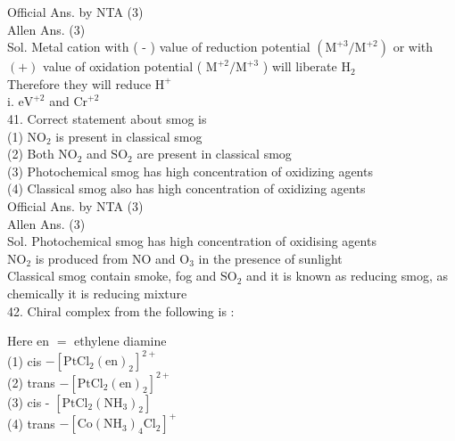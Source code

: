 \documentclass[10pt]{article}
\begin{document}
Official Ans. by NTA (3)\\
Allen Ans. (3)\\
Sol. Metal cation with ( - ) value of reduction potential \(\left(\mathrm{M}^{+3} / \mathrm{M}^{+2}\right)\) or with \((+)\) value of oxidation potential ( \(\mathrm{M}^{+2} / \mathrm{M}^{+3}\) ) will liberate \(\mathrm{H}_{2}\)\\
Therefore they will reduce \(\mathrm{H}^{+}\)\\
i. \(\mathrm{eV}^{+2}\) and \(\mathrm{Cr}^{+2}\)\\
41. Correct statement about smog is\\
(1) \(\mathrm{NO}_{2}\) is present in classical smog\\
(2) Both \(\mathrm{NO}_{2}\) and \(\mathrm{SO}_{2}\) are present in classical smog\\
(3) Photochemical smog has high concentration of oxidizing agents\\
(4) Classical smog also has high concentration of oxidizing agents\\
Official Ans. by NTA (3)\\
Allen Ans. (3)\\
Sol. Photochemical smog has high concentration of oxidising agents\\
\(\mathrm{NO}_{2}\) is produced from NO and \(\mathrm{O}_{3}\) in the presence of sunlight\\
Classical smog contain smoke, fog and \(\mathrm{SO}_{2}\) and it is known as reducing smog, as chemically it is reducing mixture\\
42. Chiral complex from the following is :

Here en \(=\) ethylene diamine\\
(1) cis \(-\left[\mathrm{PtCl}_{2}(\mathrm{en})_{2}\right]^{2+}\)\\
(2) trans \(-\left[\mathrm{PtCl}_{2}(\mathrm{en})_{2}\right]^{2+}\)\\
(3) cis - \(\left[\mathrm{PtCl}_{2}\left(\mathrm{NH}_{3}\right)_{2}\right]\)\\
(4) trans \(-\left[\mathrm{Co}\left(\mathrm{NH}_{3}\right)_{4} \mathrm{Cl}_{2}\right]^{+}\)
\end{document}
